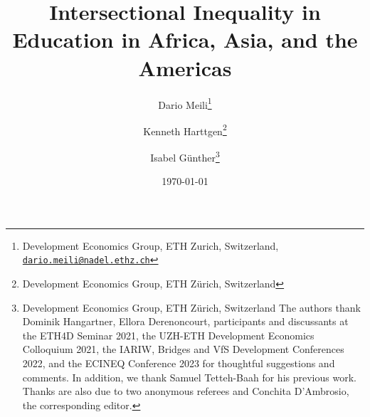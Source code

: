 

\title{Intersectional Inequality in Education in Africa, Asia, and the Americas}
\author{
   Dario Meili\thanks{Development Economics Group, ETH Zurich, Switzerland, \href{mailto:dario.meili@nadel.ethz.ch}{\nolinkurl{dario.meili@nadel.ethz.ch}} 
  } \and
  Kenneth Harttgen\thanks{
    Development Economics Group, ETH Zürich, Switzerland
  } \and
  Isabel Günther\thanks{
    Development Economics Group, ETH Zürich, Switzerland
    \newline
   The authors thank Dominik Hangartner, Ellora Derenoncourt, participants and discussants at the ETH4D Seminar 2021, the UZH-ETH Development Economics Colloquium 2021, the IARIW, Bridges and VfS Development Conferences 2022, and the ECINEQ Conference 2023 for thoughtful suggestions and comments. In addition, we thank Samuel Tetteh-Baah for his previous work. Thanks are also due to two anonymous referees and Conchita D'Ambrosio, the corresponding editor.
  }
}
\date{\today}


\maketitle
\thispagestyle{empty} %

